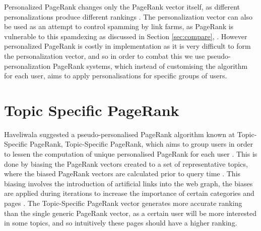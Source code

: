 \documentclass[11pt]{report}
\begin{document}
Personalized PageRank changes only the PageRank vector itself, as different personalizations produce different rankings \cite{thorson2004modeling}. The personalization vector can also be used as an attempt to control spamming by link farms, as PageRank is vulnerable to this spamdexing as discussed in Section \ref{sec:compare}, \cite{thorson2004modeling}. However personalized PageRank is costly in implementation as it is very difficult to form the personalization vector, and so in order to combat this we use pseudo-personalization PageRank systems, which instead of customising the algorithm for each user, aims to apply personalisations for specific groups of users.

\section{Topic Specific PageRank} \label{sec:Topic specific PR}

Haveliwala suggested a pseudo-personalised PageRank algorithm known at Topic-Specific PageRank, Topic-Specific PageRank, which aims to group users in order to lessen the computation of unique personalised PageRank for each user \cite{haveliwala2002topic}. This is done by biasing the PageRank vectors created to a set of representative topics, where the biased PageRank vectors are calculated prior to query time \cite{haveliwala2002topic, langville}. This biasing involves the introduction of artificial links into the web graph, the biases are applied during iterations to increase the importance of certain categories and pages \cite{haveliwala1999efficient}. The Topic-Specific PageRank vector generates more accurate ranking than the single generic PageRank vector, as a certain user will be more interested in some topics, and so intuitively these pages should have a higher ranking. 
\end{document}

